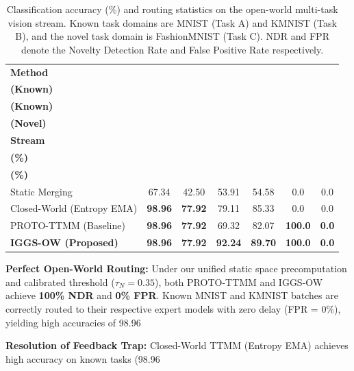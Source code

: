 \documentclass{article}
\theoremstyle{plain}
\theoremstyle{definition}
\theoremstyle{remark}
\begin{document}
\begin{table}[t]
\caption{Classification accuracy (\%) and routing statistics on the open-world multi-task vision stream. Known task domains are MNIST (Task A) and KMNIST (Task B), and the novel task domain is FashionMNIST (Task C). NDR and FPR denote the Novelty Detection Rate and False Positive Rate respectively.}
\label{tab:results}
\begin{center}
\begin{small}
\begin{tabular}{lcccccc}
\toprule
\textbf{Method} & \shortstack[c]{\textbf{MNIST}\\\textbf{(Known)}} & \shortstack[c]{\textbf{KMNIST}\\\textbf{(Known)}} & \shortstack[c]{\textbf{FashionMNIST}\\\textbf{(Novel)}} & \shortstack[c]{\textbf{Overall}\\\textbf{Stream}} & \shortstack[c]{\textbf{NDR}\\\textbf{(\%)}} & \shortstack[c]{\textbf{FPR}\\\textbf{(\%)}} \\
\midrule
Static Merging & 67.34 & 42.50 & 53.91 & 54.58 & 0.0 & 0.0 \\
Closed-World (Entropy EMA) & \textbf{98.96} & \textbf{77.92} & 79.11 & 85.33 & 0.0 & 0.0 \\
PROTO-TTMM (Baseline) & \textbf{98.96} & \textbf{77.92} & 69.32 & 82.07 & \textbf{100.0} & \textbf{0.0} \\
\textbf{IGGS-OW (Proposed)} & \textbf{98.96} & \textbf{77.92} & \textbf{92.24} & \textbf{89.70} & \textbf{100.0} & \textbf{0.0} \\
\bottomrule
\end{tabular}
\end{small}
\end{center}
\end{table}

\textbf{Perfect Open-World Routing:} Under our unified static space precomputation and calibrated threshold ($\tau_N = 0.35$), both PROTO-TTMM and IGGS-OW achieve \textbf{100\% NDR} and \textbf{0\% FPR}. Known MNIST and KMNIST batches are correctly routed to their respective expert models with zero delay (FPR = 0\%), yielding high accuracies of 98.96%

\textbf{Resolution of Feedback Trap:} Closed-World TTMM (Entropy EMA) achieves high accuracy on known tasks (98.96%
\end{document}
